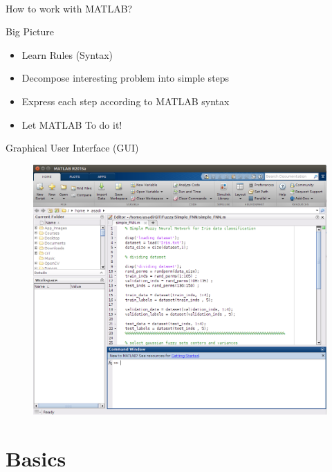 \documentclass{beamer}
\begin{document}
\begin{frame}{\\How to work with MATLAB?}
	\begin{block}{Big Picture}
		\begin{itemize}
			\item Learn Rules (Syntax)
			\item Decompose interesting problem into simple steps
			\item Express each step according to MATLAB syntax
			\item Let MATLAB To do it!
		\end{itemize}
	\end{block}
\end{frame}


\begin{frame}{Graphical User Interface (GUI)}
	\begin{block}{}
		\begin{figure}
			\center
			\includegraphics[scale=0.2]{./Imgs/GUI.png}
		\end{figure}
	\end{block}
\end{frame}


\section{Basics}
\end{document}
